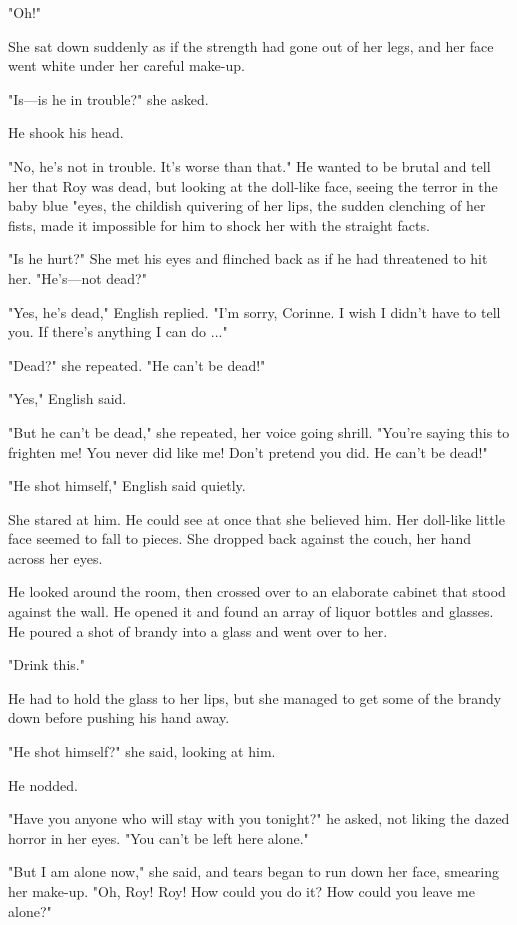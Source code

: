 \documentclass{novel}
\begin{document}
"Oh!"

She sat down suddenly as if the strength had gone out of her legs, and her face went white under her careful make-up.

"Is—is he in trouble?" she asked.

He shook his head.

"No, he's not in trouble. It's worse than that." He wanted to be brutal and tell her that Roy was dead, but looking at the doll-like face, seeing the terror in the baby blue "eyes, the childish quivering of her lips, the sudden clenching of her fists, made it impossible for him to shock her with the straight facts.

"Is he hurt?" She met his eyes and flinched back as if he had threatened to hit her. "He's—not dead?"

"Yes, he's dead," English replied. "I'm sorry, Corinne. I wish I didn't have to tell you. If there's anything I can do ..."

"Dead?" she repeated. "He can't be dead!"

"Yes," English said.

"But he can't be dead," she repeated, her voice going shrill. "You're saying this to frighten me! You never did like me! Don't pretend you did. He can't be dead!"

"He shot himself," English said quietly.

She stared at him. He could see at once that she believed him. Her doll-like little face seemed to fall to pieces. She dropped back against the couch, her hand across her eyes.

He looked around the room, then crossed over to an elaborate cabinet that stood against the wall. He opened it and found an array of liquor bottles and glasses. He poured a shot of brandy into a glass and went over to her.

"Drink this."

He had to hold the glass to her lips, but she managed to get some of the brandy down before pushing his hand away.

"He shot himself?" she said, looking at him.

He nodded.

"Have you anyone who will stay with you tonight?" he asked, not liking the dazed horror in her eyes. "You can't be left here alone."

"But I am alone now," she said, and tears began to run down her face, smearing her make-up. "Oh, Roy! Roy! How could you do it? How could you leave me alone?"
\end{document}
